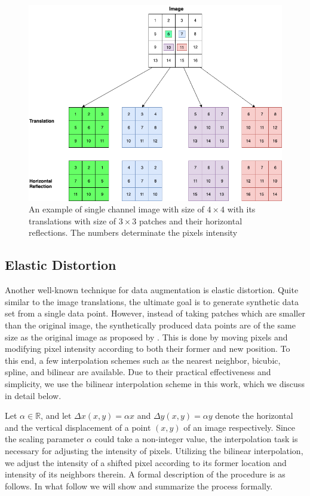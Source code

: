 \begin{figure}
  \centering
  \label{fig:label-preserving-trasformation}
  \includegraphics[width=1\textwidth]{fig/label-preserving-transformation}
  \caption{An example of single channel image with size of $4\times4$ with its translations with size of $3\times3$ patches and their horizontal reflections. The numbers determinate the pixels intensity}
\end{figure}


\subsection{Elastic Distortion}
\label{tit:elastic-distrotion}
Another well-known technique for data augmentation is elastic distortion. Quite similar to the image
translations, the ultimate goal is to generate synthetic data set from a single data point. However, instead of
taking patches which are smaller than the original image, the synthetically produced data points are
of the same size as the original image as proposed by \cite{elastic_distortion_paper} . This is done by moving pixels and modifying pixel intensity
according to both their former and new position.  To this end, a few interpolation schemes such as
the nearest neighbor, bicubic, spline, and bilinear are available. Due to their practical
effectiveness and simplicity, we use the bilinear interpolation scheme in this work, which we
discuss in detail below. 

Let $\alpha \in \mathbb{R}$, and let $\Delta x(x,  y) = \alpha x$ and $\Delta y(x,  y) = \alpha y$
denote the horizontal and the vertical displacement of a point $(x, y)$ of an image respectively.
Since the scaling parameter $\alpha$ could take a non-integer value, the interpolation task is
necessary for adjusting the intensity of pixels. Utilizing the bilinear interpolation, we adjust the
intensity of a shifted pixel according to its former location and intensity of its neighbors
therein. A formal description of the procedure is as follows. In what follow we will show and summarize the
process formally.

